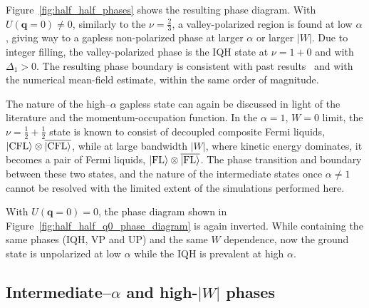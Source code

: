 Figure~\ref{fig:half_half_phases} shows the resulting phase diagram. With $U(\mathbf{q}=0) \neq 0$, similarly to the $\nu=\frac{2}{3}$, a valley-polarized region is found at low $\alpha$, giving way to a gapless non-polarized phase at larger $\alpha$ or larger $|W|$. Due to integer filling, the valley-polarized phase is the IQH state at $\nu = 1 + 0$ and with $\Delta_1 > 0$. The resulting phase boundary is consistent with past results~\cite{kwan2025textured} and with the numerical mean-field estimate, within the same order of magnitude.

The nature of the high--$\alpha$ gapless state can again be discussed in light of the literature and the momentum-occupation function. In the $\alpha = 1$, $W=0$ limit, the $\nu = \tfrac{1}{2} + \tfrac{1}{2}$ state is known to consist of decoupled composite Fermi liquids, $\ket{\text{CFL}} \otimes \overline{\ket{\text{CFL}}}$, while at large bandwidth $|W|$, where kinetic energy dominates, it becomes a pair of Fermi liquids, $\ket{\text{FL}} \otimes \overline{\ket{\text{FL}}}$. The phase transition and boundary between these two states, and the nature of the intermediate states once $\alpha \neq 1$ cannot be resolved with the limited extent of the simulations performed here.

With $U(\mathbf{q}=0) = 0$, the phase diagram shown in Figure~\ref{fig:half_half_q0_phase_diagram} is again inverted. While containing the same phases (IQH, VP and UP) and the same $W$ dependence, now the ground state is unpolarized at low $\alpha$ while the IQH is prevalent at high $\alpha$.

\subsection{\texorpdfstring{Intermediate--$\alpha$ and high-$|W|$ phases}{Intermediate-alpha and high-W phases}}\label{sec:intermediate_alpha_half_half}


